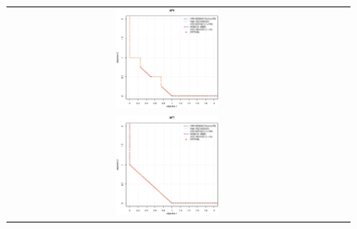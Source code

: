 \begin{figure}[H]
\begin{tabular}{ccc}
  \includegraphics[width=0.33\textwidth]{Figures_Chapter7/Results_Chapter4/Surface_eps_VSD_MOEA/UF6.eps} \\
  \includegraphics[width=0.33\textwidth]{Figures_Chapter7/Results_Chapter4/Surface_eps_VSD_MOEA/UF7.eps} 
\end{tabular}
\end{figure}

